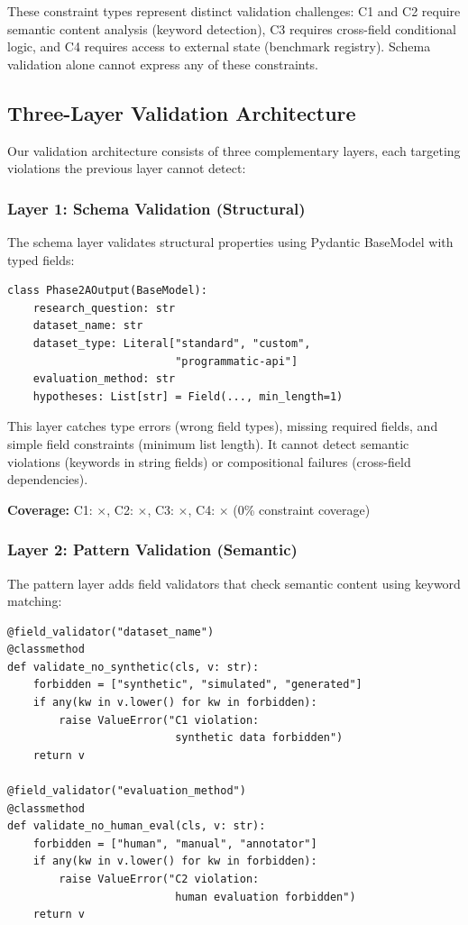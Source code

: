 These constraint types represent distinct validation challenges: C1 and C2 require semantic content analysis (keyword detection), C3 requires cross-field conditional logic, and C4 requires access to external state (benchmark registry). Schema validation alone cannot express any of these constraints.

\subsection{Three-Layer Validation Architecture}

Our validation architecture consists of three complementary layers, each targeting violations the previous layer cannot detect:

\subsubsection{Layer 1: Schema Validation (Structural)}

The schema layer validates structural properties using Pydantic BaseModel with typed fields:

\begin{verbatim}
class Phase2AOutput(BaseModel):
    research_question: str
    dataset_name: str
    dataset_type: Literal["standard", "custom",
                          "programmatic-api"]
    evaluation_method: str
    hypotheses: List[str] = Field(..., min_length=1)
\end{verbatim}

This layer catches type errors (wrong field types), missing required fields, and simple field constraints (minimum list length). It cannot detect semantic violations (keywords in string fields) or compositional failures (cross-field dependencies).

\textbf{Coverage:} C1: $\times$, C2: $\times$, C3: $\times$, C4: $\times$ (0\% constraint coverage)

\subsubsection{Layer 2: Pattern Validation (Semantic)}

The pattern layer adds field validators that check semantic content using keyword matching:

\begin{verbatim}
@field_validator("dataset_name")
@classmethod
def validate_no_synthetic(cls, v: str):
    forbidden = ["synthetic", "simulated", "generated"]
    if any(kw in v.lower() for kw in forbidden):
        raise ValueError("C1 violation:
                          synthetic data forbidden")
    return v

@field_validator("evaluation_method")
@classmethod
def validate_no_human_eval(cls, v: str):
    forbidden = ["human", "manual", "annotator"]
    if any(kw in v.lower() for kw in forbidden):
        raise ValueError("C2 violation:
                          human evaluation forbidden")
    return v
\end{verbatim}

